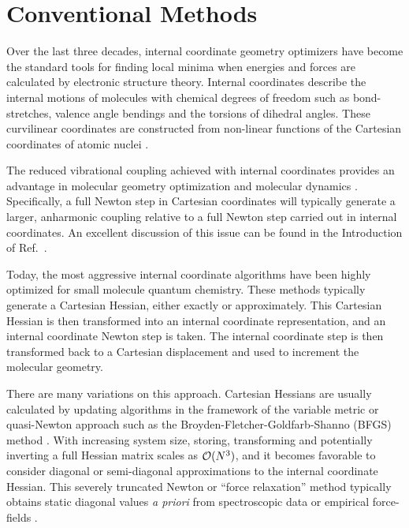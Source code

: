 \documentclass[prl,aps,preprint,showpacs,superbib]{revtex4}
\begin{document}
\section{Conventional Methods}\label{conventional}

Over the last three decades, internal coordinate geometry optimizers have become the standard 
tools for finding local minima when energies and forces are calculated by electronic structure 
theory. Internal coordinates describe the internal motions of molecules 
with chemical degrees of freedom such as bond-stretches, valence angle bendings and the torsions 
of dihedral angles. These curvilinear coordinates are constructed from non-linear functions of the 
Cartesian coordinates of atomic nuclei \cite{wilson}.

The reduced vibrational coupling achieved with internal coordinates provides an advantage 
in molecular geometry optimization \cite{pulay_review} and molecular dynamics \cite{pulay_dynamics}.
Specifically, a full Newton step in Cartesian coordinates will typically generate a larger, 
anharmonic coupling relative to a full Newton step carried out in internal coordinates.
An excellent discussion of this issue can be found in the Introduction of Ref.~\cite{Pulay_natural_internals}.

Today, the most aggressive internal coordinate algorithms have been highly optimized for 
small molecule quantum chemistry.  These methods typically generate a Cartesian Hessian,
either exactly or approximately. This Cartesian Hessian is then transformed into an internal 
coordinate representation, and an internal coordinate Newton step is taken. The internal 
coordinate step is then transformed back to a Cartesian displacement and used to increment the 
molecular geometry.

There are many variations on this approach.  Cartesian Hessians are usually calculated by updating 
algorithms in the framework of the variable metric or quasi-Newton approach such as the  
Broyden-Fletcher-Goldfarb-Shanno (BFGS) method \cite{RFletcher}.  With increasing system size, storing,
transforming and potentially inverting a full Hessian matrix scales as ${\cal O}(N^3)$, and it becomes
favorable to consider diagonal or semi-diagonal approximations to the internal coordinate Hessian. 
This severely truncated Newton or  ``force relaxation'' method typically obtains static diagonal values 
{\em a priori} from spectroscopic data or empirical force-fields 
\cite{pulay_69,fogarasi_diaghess,Pulay_natural_internals,pulay_review,sellers,van_alsenoy_98,lindh}.
\end{document}
